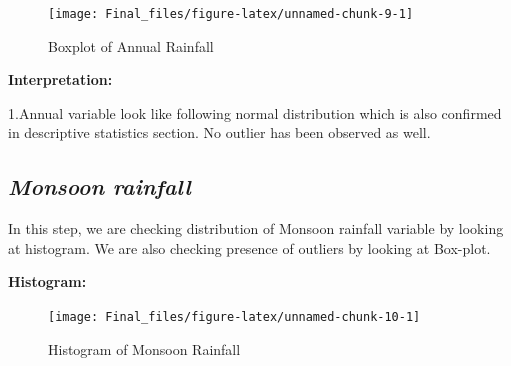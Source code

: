 \documentclass[12pt,openany]{book}
\newenvironment{Shaded}{\begin{snugshade}}{\end{snugshade}}
\newcommand{\CommentTok}[1]{\textcolor[rgb]{0.56,0.35,0.01}{\textit{#1}}}
\newcommand{\DataTypeTok}[1]{\textcolor[rgb]{0.13,0.29,0.53}{#1}}
\newcommand{\KeywordTok}[1]{\textcolor[rgb]{0.13,0.29,0.53}{\textbf{#1}}}
\newcommand{\NormalTok}[1]{#1}
\newcommand{\OperatorTok}[1]{\textcolor[rgb]{0.81,0.36,0.00}{\textbf{#1}}}
\newcommand{\OtherTok}[1]{\textcolor[rgb]{0.56,0.35,0.01}{#1}}
\newcommand{\StringTok}[1]{\textcolor[rgb]{0.31,0.60,0.02}{#1}}
\begin{document}
\begin{figure}

{\centering \texttt{[image: Final\_files/figure-latex/unnamed-chunk-9-1]} 

}

\caption{Boxplot of Annual Rainfall}\label{fig:unnamed-chunk-9}
\end{figure}

\textbf{Interpretation:}

1.Annual variable look like following normal distribution which is also confirmed in descriptive statistics section. No outlier has been observed as well.

\hypertarget{monsoon-rainfall}{%
\subsection{\texorpdfstring{\textbf{\emph{Monsoon rainfall}}}{Monsoon rainfall}}\label{monsoon-rainfall}}

In this step, we are checking distribution of Monsoon rainfall variable by looking at histogram. We are also checking presence of outliers by looking at Box-plot.

\textbf{Histogram:}

\begin{Shaded}
\end{Shaded}

\begin{figure}

{\centering \texttt{[image: Final\_files/figure-latex/unnamed-chunk-10-1]} 

}

\caption{Histogram of Monsoon Rainfall}\label{fig:unnamed-chunk-10}
\end{figure}
\end{document}
